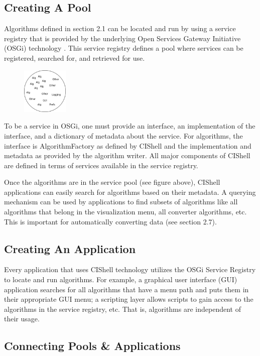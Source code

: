 \subsection{Creating A Pool}

Algorithms defined in section 2.1 can be located and run by using a 
service registry that is provided by the underlying Open Services Gateway 
Initiative (OSGi) technology \cite{osgi}. This service registry defines a pool 
where services can be registered, searched for, and retrieved for use.
\begin{figure} 
\includegraphics[width=22mm,height=22mm,clip=true]{graphics/algorithmPool.png} 
\end{figure} To be a service in OSGi, one must provide an interface, an 
implementation of the interface, and a dictionary of metadata about the 
service. For algorithms, the interface is AlgorithmFactory as defined by 
CIShell and the implementation and metadata as provided by the algorithm 
writer. All major components of CIShell are defined in terms of services 
available in the service registry.

Once the algorithms are in the service pool (see figure above), CIShell 
applications can easily search for algorithms based on their metadata. A 
querying mechanism can be used by applications to find subsets of algorithms 
like all algorithms that belong in the visualization menu, all converter 
algorithms, etc. This is important for automatically converting data (see 
section 2.7).

\subsection{Creating An Application}

Every application that uses CIShell technology utilizes the OSGi Service 
Registry to locate and run algorithms. For example, a graphical user interface 
(GUI) application searches for all algorithms that have a menu path and puts 
them in their appropriate GUI menu; a scripting layer allows scripts to gain 
access to the algorithms in the service registry, etc. That is, algorithms are 
independent of their usage.

\subsection{Connecting Pools \& Applications}

